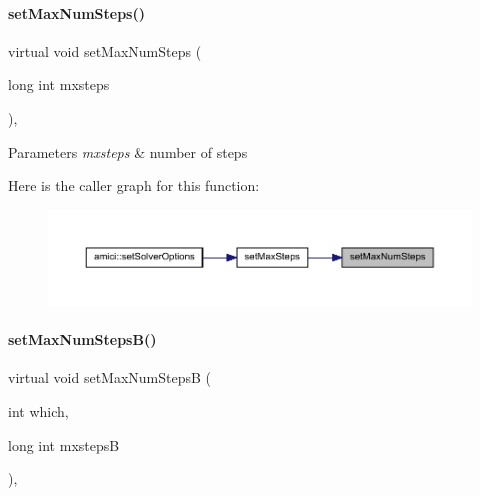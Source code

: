 \paragraph{\texorpdfstring{setMaxNumSteps()}{setMaxNumSteps()}}
{\footnotesize\ttfamily virtual void set\+Max\+Num\+Steps (\begin{DoxyParamCaption}\item[{long int}]{mxsteps }\end{DoxyParamCaption})\hspace{0.3cm}{\ttfamily [protected]}, {}}


\begin{DoxyParams}{Parameters}
{\em mxsteps} & number of steps \\
\hline
\end{DoxyParams}
Here is the caller graph for this function\+:
\nopagebreak
\begin{figure}[H]
\begin{center}
\leavevmode
\includegraphics[width=350pt]{classamici_1_1_solver_a29f208ce304b01c8fe294ab9143a98e5_icgraph}
\end{center}
\end{figure}
\mbox{\label{classamici_1_1_solver_a1163fddb222195354bdcf306fc52a1d0}} 
\paragraph{\texorpdfstring{setMaxNumStepsB()}{setMaxNumStepsB()}}
{\footnotesize\ttfamily virtual void set\+Max\+Num\+StepsB (\begin{DoxyParamCaption}\item[{int}]{which,  }\item[{long int}]{mxstepsB }\end{DoxyParamCaption})\hspace{0.3cm}{\ttfamily [protected]}, {}}


